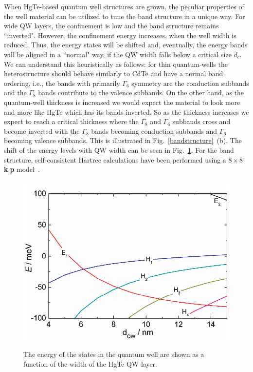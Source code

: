 \documentclass{article}
\begin{document}
When HgTe-based quantum well structures are grown, the peculiar
properties of the well material can be utilized to tune the band
structure in a unique way. For wide QW layers, the confinement is
low and the band structure remains ``inverted". However, the
confinement energy increases, when the well width is reduced. Thus,
the energy states will be shifted and, eventually, the energy bands
will be aligned in a ``normal" way, if the QW width falls below a
critical size $d_{c}$. We can understand this heuristically  as
follows: for thin quantum-wells the heterostructure should behave
similarly to CdTe and have a normal band ordering, i.e., the bands
with primarily $\Gamma_6$ symmetry are the conduction subbands and
the $\Gamma_8$ bands contribute to the valence subbands. On the
other hand, as the quantum-well thickness is increased we would
expect the material to look more and more like HgTe which has its
bands inverted. So as the thickness increases we expect to reach a
critical thickness where the $\Gamma_8$ and $\Gamma_6$ subbands
cross and become inverted with the $\Gamma_8$ bands becoming
conduction subbands and $\Gamma_6$ becoming valence subbands. This
is illustrated in Fig.~\ref{bandstructure}~(b). The shift of the
energy levels with QW width can be seen in Fig.~\ref{FigEd}. For the
band structure, self-consistent Hartree calculations have been
performed using a $8\times8$ {\bf k$\cdot$p} model~\cite{Novik05}.
\begin{figure}[hbt]
\centering
 \includegraphics[scale=0.85]{80608Fig02.eps}\\
 \caption{The energy of the states in the quantum well are shown as
 a function of the width of the HgTe QW layer.}
 \label{FigEd}
\end{figure}
\end{document}
